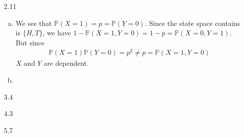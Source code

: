 \documentclass[a4paper,10pt]{article}
\theoremstyle{definition}
\begin{document}
\begin{enumerate}
\begin{enumerate}[(a)]
\end{enumerate}
\item[2.11]
\begin{enumerate}[(a)]
\item We see that $\mathbb{P}(X = 1) = p = \mathbb{P}(Y=0)$. Since the state space contains is $\{H,T\}$, we have $1 - \mathbb{P}(X =1,Y=0) = 1- p = \mathbb{P}(X = 0, Y = 1)$. But since
\begin{align*}
\mathbb{P}(X = 1)\mathbb{P}(Y=0) = p^2 \neq p = \mathbb{P}(X = 1, Y =0)
\end{align*}
$X$ and $Y$ are dependent.
\item 
\end{enumerate}

\item[3.4]
\item[4.3]
\item[5.7]
\end{enumerate}
\end{document}

